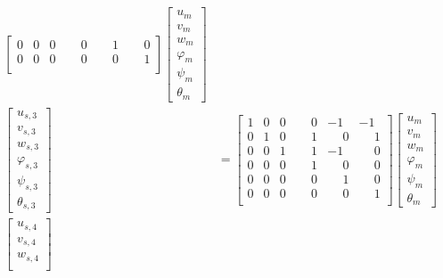 \documentclass[10pt,b5paper,titlepage]{book}
\newenvironment{eqarray}
{
    \begin{eqnarray}
        \begin{aligned}
}
{
        \end{aligned}
    \end{eqnarray}
}
\begin{document}
\begin{eqarray}
\begin{bmatrix}
        0 & 0 & 0 & \phantom{-}0 & \phantom{-}1 & \phantom{-}0 \\
        0 & 0 & 0 & \phantom{-}0 & \phantom{-}0 & \phantom{-}1 \\
    \end{bmatrix}
    \begin{bmatrix}
        u_m \\
        v_m \\
        w_m \\
        \varphi_m \\
        \psi_m \\
        \theta_m
    \end{bmatrix} \\
    \begin{bmatrix}
        u_{s,3} \\
        v_{s,3} \\
        w_{s,3} \\
        \varphi_{s,3} \\
        \psi_{s,3} \\
        \theta_{s,3}
    \end{bmatrix}
    &= \begin{bmatrix}
        1 & 0 & 0 & \phantom{-}0 & -1 & -1 \\
        0 & 1 & 0 & \phantom{-}1 & \phantom{-}0 & \phantom{-}1 \\
        0 & 0 & 1 & \phantom{-}1 & -1 & \phantom{-}0 \\
        0 & 0 & 0 & \phantom{-}1 & \phantom{-}0 & \phantom{-}0 \\
        0 & 0 & 0 & \phantom{-}0 & \phantom{-}1 & \phantom{-}0 \\
        0 & 0 & 0 & \phantom{-}0 & \phantom{-}0 & \phantom{-}1 \\
    \end{bmatrix}
    \begin{bmatrix}
        u_m \\
        v_m \\
        w_m \\
        \varphi_m \\
        \psi_m \\
        \theta_m
    \end{bmatrix} \\
    \begin{bmatrix}
        u_{s,4} \\
        v_{s,4} \\
        w_{s,4} \\

\end{bmatrix}
\end{eqarray}
\end{document}
